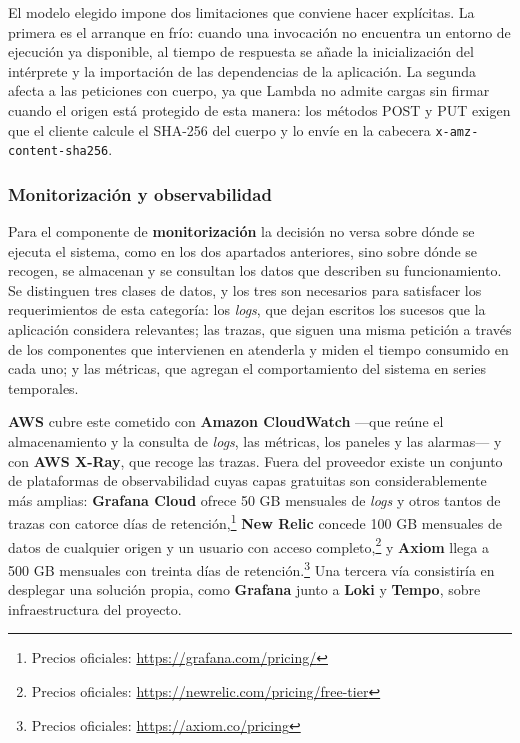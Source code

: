 El modelo elegido impone dos limitaciones que conviene hacer explícitas. La primera es el arranque en frío: cuando una invocación no encuentra un entorno de ejecución ya disponible, al tiempo de respuesta se añade la inicialización del intérprete y la importación de las dependencias de la aplicación. La segunda afecta a las peticiones con cuerpo, ya que Lambda no admite cargas sin firmar cuando el origen está protegido de esta manera: los métodos POST y PUT exigen que el cliente calcule el SHA-256 del cuerpo y lo envíe en la cabecera \texttt{x-amz-content-sha256}.

\subsubsection*{Monitorización y observabilidad}

Para el componente de \textbf{monitorización} la decisión no versa sobre dónde se ejecuta el sistema, como en los dos apartados anteriores, sino sobre dónde se recogen, se almacenan y se consultan los datos que describen su funcionamiento. Se distinguen tres clases de datos, y los tres son necesarios para satisfacer los requerimientos de esta categoría: los \textit{logs}, que dejan escritos los sucesos que la aplicación considera relevantes; las trazas, que siguen una misma petición a través de los componentes que intervienen en atenderla y miden el tiempo consumido en cada uno; y las métricas, que agregan el comportamiento del sistema en series temporales.

\textbf{AWS} cubre este cometido con \textbf{Amazon CloudWatch} —que reúne el almacenamiento y la consulta de \textit{logs}, las métricas, los paneles y las alarmas— y con \textbf{AWS X-Ray}, que recoge las trazas. Fuera del proveedor existe un conjunto de plataformas de observabilidad cuyas capas gratuitas son considerablemente más amplias: \textbf{Grafana Cloud} ofrece 50 GB mensuales de \textit{logs} y otros tantos de trazas con catorce días de retención,\footnote{Precios oficiales: \url{https://grafana.com/pricing/}} \textbf{New Relic} concede 100 GB mensuales de datos de cualquier origen y un usuario con acceso completo,\footnote{Precios oficiales: \url{https://newrelic.com/pricing/free-tier}} y \textbf{Axiom} llega a 500 GB mensuales con treinta días de retención.\footnote{Precios oficiales: \url{https://axiom.co/pricing}} Una tercera vía consistiría en desplegar una solución propia, como \textbf{Grafana} junto a \textbf{Loki} y \textbf{Tempo}, sobre infraestructura del proyecto.

